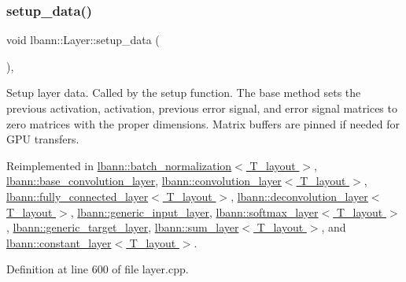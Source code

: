 \subsubsection{\texorpdfstring{setup\+\_\+data()}{setup\_data()}}
{\footnotesize\ttfamily void lbann\+::\+Layer\+::setup\+\_\+data (\begin{DoxyParamCaption}{ }\end{DoxyParamCaption})\hspace{0.3cm}{\ttfamily [protected]}, {\ttfamily [virtual]}}

Setup layer data. Called by the setup function. The base method sets the previous activation, activation, previous error signal, and error signal matrices to zero matrices with the proper dimensions. Matrix buffers are pinned if needed for G\+PU transfers. 

Reimplemented in \hyperlink{classlbann_1_1batch__normalization_ac046a5ab567cc01f9a36c6b0fc4e3b55}{lbann\+::batch\+\_\+normalization$<$ T\+\_\+layout $>$}, \hyperlink{classlbann_1_1base__convolution__layer_a9f850c1bdf4ae3cd986411d3cb3a524c}{lbann\+::base\+\_\+convolution\+\_\+layer}, \hyperlink{classlbann_1_1convolution__layer_ab20636b44d2b17abdb5424df54cb9c6d}{lbann\+::convolution\+\_\+layer$<$ T\+\_\+layout $>$}, \hyperlink{classlbann_1_1fully__connected__layer_aec4298146845489597126503177d3127}{lbann\+::fully\+\_\+connected\+\_\+layer$<$ T\+\_\+layout $>$}, \hyperlink{classlbann_1_1deconvolution__layer_a6d891396ea1c91030cd647cc111c8c5f}{lbann\+::deconvolution\+\_\+layer$<$ T\+\_\+layout $>$}, \hyperlink{classlbann_1_1generic__input__layer_a8ca316b0369689949f3f4106920ec28f}{lbann\+::generic\+\_\+input\+\_\+layer}, \hyperlink{classlbann_1_1softmax__layer_a4cc8f1f44a2854e78dad4f898d66a5ac}{lbann\+::softmax\+\_\+layer$<$ T\+\_\+layout $>$}, \hyperlink{classlbann_1_1generic__target__layer_a73b35ee4dcb97a166369426d975596b2}{lbann\+::generic\+\_\+target\+\_\+layer}, \hyperlink{classlbann_1_1sum__layer_a9f8659993a180f1bb1a8bd875814d33b}{lbann\+::sum\+\_\+layer$<$ T\+\_\+layout $>$}, and \hyperlink{classlbann_1_1constant__layer_ad46d9db2e6bad4204dcedd2be60bfb1a}{lbann\+::constant\+\_\+layer$<$ T\+\_\+layout $>$}.



Definition at line 600 of file layer.\+cpp.


